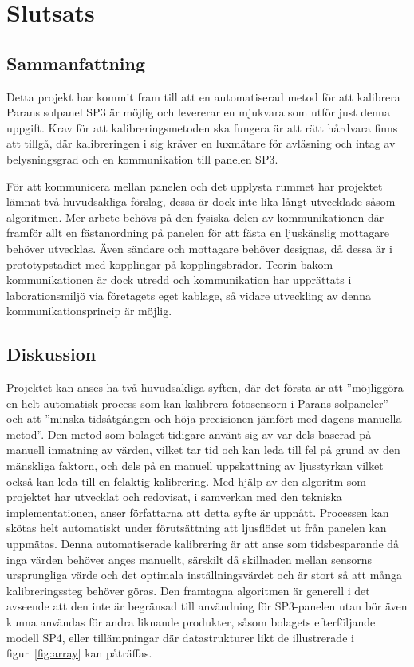 \section{Slutsats} %
\label{sec:slutsats}
    \subsection{Sammanfattning} %
    \label{sub:sammanfattning}
        Detta projekt har kommit fram till att en automatiserad metod för att kalibrera Parans solpanel SP3 är möjlig och levererar en mjukvara som utför just denna uppgift. Krav för att kalibreringsmetoden ska fungera är att rätt hårdvara finns att tillgå, där kalibreringen i sig kräver en luxmätare för avläsning och intag av belysningsgrad och en kommunikation till panelen SP3.\bigskip 

        För att kommunicera mellan panelen och det upplysta rummet har projektet lämnat två huvudsakliga förslag, dessa är dock inte lika långt utvecklade såsom algoritmen. Mer arbete behövs på den fysiska delen av kommunikationen där framför allt en fästanordning på panelen för att fästa en ljuskänslig mottagare behöver utvecklas. Även sändare och mottagare behöver designas, då dessa är i prototypstadiet med kopplingar på kopplingsbrädor. Teorin bakom kommunikationen är dock utredd och kommunikation har upprättats i laborationsmiljö via företagets eget kablage, så vidare utveckling av denna kommunikationsprincip är möjlig.

    \subsection{Diskussion} %
    \label{sub:diskussion}

        Projektet kan anses ha två huvudsakliga syften, där det första är att ''möjliggöra en helt automatisk process som kan kalibrera fotosensorn i Parans solpaneler'' och att  ''minska tidsåtgången och höja  precisionen jämfört med dagens manuella metod''. 
        Den metod som bolaget tidigare använt sig av var dels baserad på manuell inmatning av värden, vilket tar tid och kan leda till fel på grund av den mänskliga faktorn, och dels på en manuell uppskattning av ljusstyrkan vilket också kan leda till en felaktig kalibrering. 
        Med hjälp av den algoritm som projektet har utvecklat och redovisat, i samverkan med den tekniska implementationen, anser författarna att detta syfte är uppnått. Processen kan skötas helt automatiskt under förutsättning att ljusflödet ut från panelen kan uppmätas. 
        Denna automatiserade kalibrering är att anse som tidsbesparande då inga värden behöver anges manuellt, särskilt då skillnaden mellan sensorns ursprungliga värde och det optimala inställningsvärdet och är stort så att många kalibreringssteg behöver göras. Den framtagna algoritmen är generell i det avseende att den inte är begränsad till användning för SP3-panelen utan bör även kunna användas för andra liknande produkter, såsom bolagets efterföljande modell SP4, eller tillämpningar där datastrukturer likt de illustrerade i figur~\ref{fig:array} kan påträffas.\bigskip

